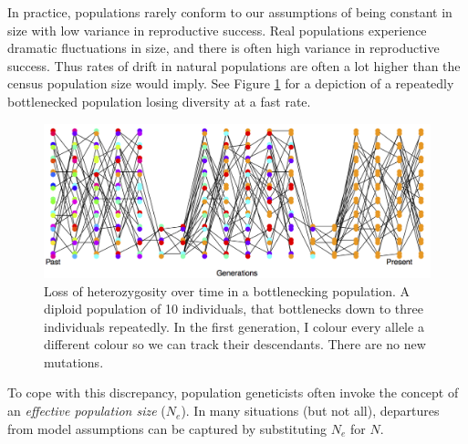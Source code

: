 In practice, populations rarely conform to our assumptions of being constant in size with low variance in reproductive success. Real populations experience dramatic fluctuations in size, and there is
often high variance in reproductive success. Thus rates of drift in
natural populations are often a lot higher than the census population
size would imply. See Figure \ref{fig:LossHet_varying_pop}  for a depiction of
a repeatedly bottlenecked population losing diversity at a fast rate.

\begin{figure}
\begin{center}
\includegraphics[width= \textwidth]{figures/Loss_of_he_col_alleles_varying_pop_dark.png}
\end{center}
\caption{Loss of heterozygosity over time in a bottlenecking population. A diploid population of 10 individuals, that bottlenecks
  down to three individuals repeatedly. In the first generation, I colour every allele a different
colour so we can track their descendants. There are no new
  mutations. } \label{fig:LossHet_varying_pop}
\end{figure}


To cope with this discrepancy, population geneticists often invoke the concept of
an \emph{effective population size} ($N_e$). In many situations (but not all), departures from model assumptions can be captured by substituting $N_e$ for $N$.
\\


